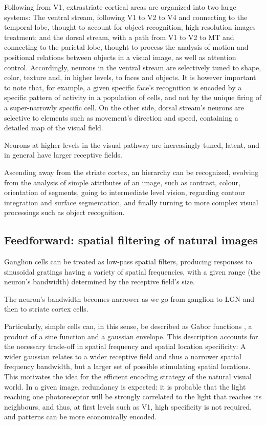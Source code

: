 Following from V1, extrastriate cortical areas are organized into two large systems: The ventral stream, following V1 to V2 to V4 and connecting to the temporal lobe, thought to account for object recognition, high-resolution images treatment; and the dorsal stream, with a path from V1 to V2 to MT and connecting to the parietal lobe, thought to process the analysis of motion and positional relations between objects in a visual image, as well as attention control. Accordingly, neurons in the ventral stream are selectively tuned to shape, color, texture and, in higher levels, to faces and objects. It is however important to note that, for example, a given specific face's recognition is encoded by a specific pattern of activity in a population of cells, and not by the unique firing of a super-narrowly specific cell. On the other side, dorsal stream's neurons are selective to elements such as movement's direction and speed, containing a detailed map of the visual field.

Neurons at higher levels in the visual pathway are increasingly tuned, latent, and in general have larger receptive fields.

Ascending away from the striate cortex, an hierarchy can be recognized, evolving from the analysis of simple attributes of an image, such as contrast, colour, orientation of segments, going to intermediate level vision, regarding contour integration and surface segmentation, and finally turning to more complex visual processings such as object recognition. 


\subsection{Feedforward: spatial filtering of natural images}

Ganglion cells can be treated as low-pass spatial filters, producing responses to sinusoidal gratings having a variety of spatial frequencies, with a given range (the neuron's bandwidth) determined by the receptive field's size. 

The neuron's bandwidth becomes narrower as we go from ganglion to LGN and then to striate cortex cells. 

Particularly, simple cells can, in this sense, be described as Gabor functions \cite{Jones1987}, a product of a sine function and a gaussian envelope. This description accounts for the necessary trade-off in spatial frequency and spatial location specificity: A wider gaussian relates to a wider receptive field and thus a narrower spatial frequency bandwidth, but a larger set of possible stimulating spatial locations. This motivates the idea for the efficient encoding strategy of the natural visual world. In a given image, redundancy is expected: it is probable that the light reaching one photoreceptor will be strongly correlated to the light that reaches its neighbours, and thus, at first levels such as V1, high specificity is not required, and patterns can be more economically encoded.

